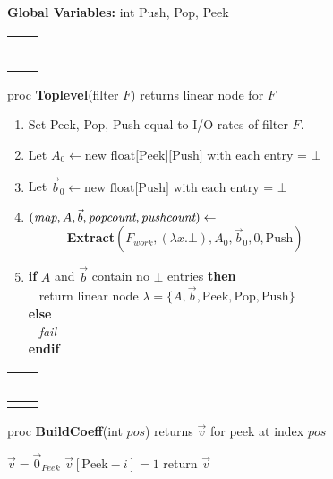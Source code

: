 \begin{algorithm}
{\bf Global Variables:} int Push, Pop, Peek \\
\begin{tabular}{l}
~\hspace{3in}~ \\
\hline \\
\end{tabular}
proc {\bf Toplevel}(filter $F$) returns linear node for $F$
\begin{enumerate}
\item Set Peek, Pop, Push equal to I/O rates of filter $F$.
\item Let $A_{0} \leftarrow \mbox{new float[Peek][Push] with each entry =~} \bot$
\item Let ${\vec b_{0}} \leftarrow \mbox{new float[Push] with each entry =~} \bot$
\item $(\mbox{\it map}, A, {\vec b}, \mbox{\it popcount}, \mbox{\it pushcount}) \leftarrow$ \\
\verb+      +{\bf Extract}$(F_{work}, (\lambda x . \bot), A_{0}, {\vec b_{0}}, 0, \mbox{Push})$
\item {\bf if} $A$ and ${\vec b}$ contain no $\bot$ entries {\bf then} \\
\verb+ + return linear node $\lambda = \{A, {\vec b}, \mbox{Peek}, \mbox{Pop}, \mbox{Push}\}$ \\
 {\bf else} \\
\verb+ + {\it fail} \\
 {\bf endif}
\end{enumerate}
\begin{tabular}{l}
~\hspace{3in}~ \\
\hline \\
\end{tabular}
proc {\bf BuildCoeff}(int $pos$) returns $\vec v$ for peek at index $pos$ \\ \vspace{-12pt}
\begin{algorithmic}
\STATE $\vec v = \vec 0_{Peek}$
\STATE $\vec v[\mbox{Peek}-i] = 1$
\STATE return $\vec v$
\end{algorithmic}
\end{algorithm}

